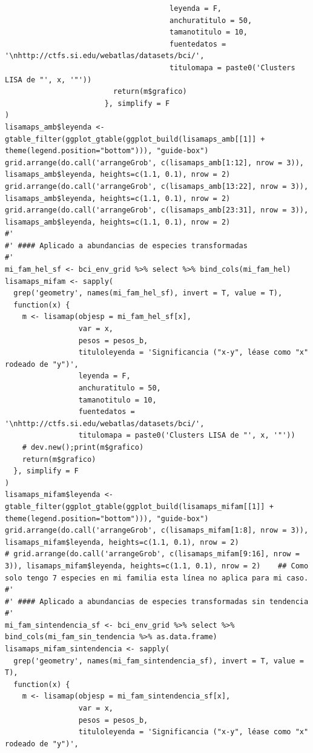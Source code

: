 \documentclass[11pt,]{article}
\begin{document}
\begin{verbatim}
                                      leyenda = F,
                                      anchuratitulo = 50,
                                      tamanotitulo = 10,
                                      fuentedatos = '\nhttp://ctfs.si.edu/webatlas/datasets/bci/',
                                      titulomapa = paste0('Clusters LISA de "', x, '"'))
                         return(m$grafico)
                       }, simplify = F
)
lisamaps_amb$leyenda <- gtable_filter(ggplot_gtable(ggplot_build(lisamaps_amb[[1]] + theme(legend.position="bottom"))), "guide-box")
grid.arrange(do.call('arrangeGrob', c(lisamaps_amb[1:12], nrow = 3)), lisamaps_amb$leyenda, heights=c(1.1, 0.1), nrow = 2)
grid.arrange(do.call('arrangeGrob', c(lisamaps_amb[13:22], nrow = 3)), lisamaps_amb$leyenda, heights=c(1.1, 0.1), nrow = 2)
grid.arrange(do.call('arrangeGrob', c(lisamaps_amb[23:31], nrow = 3)), lisamaps_amb$leyenda, heights=c(1.1, 0.1), nrow = 2)
#' 
#' #### Aplicado a abundancias de especies transformadas
#' 
mi_fam_hel_sf <- bci_env_grid %>% select %>% bind_cols(mi_fam_hel)
lisamaps_mifam <- sapply(
  grep('geometry', names(mi_fam_hel_sf), invert = T, value = T),
  function(x) {
    m <- lisamap(objesp = mi_fam_hel_sf[x],
                 var = x,
                 pesos = pesos_b,
                 tituloleyenda = 'Significancia ("x-y", léase como "x" rodeado de "y")',
                 leyenda = F,
                 anchuratitulo = 50,
                 tamanotitulo = 10,
                 fuentedatos = '\nhttp://ctfs.si.edu/webatlas/datasets/bci/',
                 titulomapa = paste0('Clusters LISA de "', x, '"'))
    # dev.new();print(m$grafico)
    return(m$grafico)
  }, simplify = F
)
lisamaps_mifam$leyenda <- gtable_filter(ggplot_gtable(ggplot_build(lisamaps_mifam[[1]] + theme(legend.position="bottom"))), "guide-box")
grid.arrange(do.call('arrangeGrob', c(lisamaps_mifam[1:8], nrow = 3)), lisamaps_mifam$leyenda, heights=c(1.1, 0.1), nrow = 2)
# grid.arrange(do.call('arrangeGrob', c(lisamaps_mifam[9:16], nrow = 3)), lisamaps_mifam$leyenda, heights=c(1.1, 0.1), nrow = 2)    ## Como solo tengo 7 especies en mi familia esta línea no aplica para mi caso.
#' 
#' #### Aplicado a abundancias de especies transformadas sin tendencia
#' 
mi_fam_sintendencia_sf <- bci_env_grid %>% select %>% bind_cols(mi_fam_sin_tendencia %>% as.data.frame)
lisamaps_mifam_sintendencia <- sapply(
  grep('geometry', names(mi_fam_sintendencia_sf), invert = T, value = T),
  function(x) {
    m <- lisamap(objesp = mi_fam_sintendencia_sf[x],
                 var = x,
                 pesos = pesos_b,
                 tituloleyenda = 'Significancia ("x-y", léase como "x" rodeado de "y")',

\end{verbatim}
\end{document}
